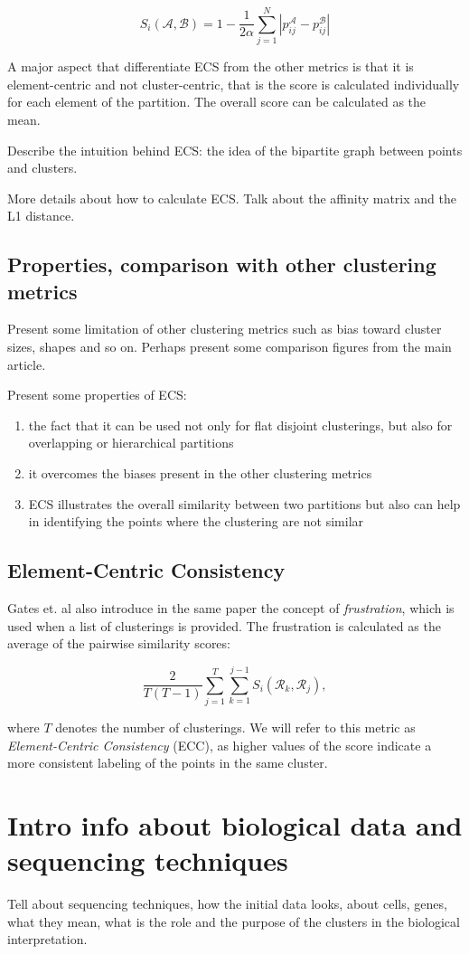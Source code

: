     \[ S_i (\mathcal{A}, \mathcal{B}) = 1 - \frac{1}{2 \alpha} \sum_{j = 1}^N |p_{ij}^{\mathcal{A}} - p_{ij}^{\mathcal{B}} | \]

    A major aspect that differentiate ECS from the other metrics is that it is element-centric and not cluster-centric, that is the score is calculated individually for each element of the partition. The overall score can be calculated as the mean.

    Describe the intuition behind ECS: the idea of the bipartite graph between points and clusters.

    More details about how to calculate ECS. Talk about the affinity matrix and the L1 distance.
    \subsection{Properties, comparison with other clustering metrics}
    Present some limitation of other clustering metrics such as bias toward cluster sizes, shapes and so on. Perhaps present some comparison figures from the main article.

    Present some properties of ECS:
    \begin{enumerate}
        \item the fact that it can be used not only for flat disjoint clusterings, but also for overlapping or hierarchical partitions
        \item it overcomes the biases present in the other clustering metrics
        \item ECS illustrates the overall similarity between two partitions but also can help in identifying the points where the clustering are not similar
    \end{enumerate}
    \subsection{Element-Centric Consistency}
    Gates et. al also introduce in the same paper the concept of \textit{frustration}, which is used when a list of clusterings is provided. The frustration is calculated as the average of the pairwise similarity scores:

    \[ \frac{2}{T(T-1)} \sum_{j=1}^T \sum_{k=1}^{j-1} S_i (\mathcal{R}_k, \mathcal{R}_j), \]

    where $T$ denotes the number of clusterings. We will refer to this metric as \textit{Element-Centric Consistency} (ECC), as higher values of the score indicate a more consistent labeling of the points in the same cluster.
    

\section{Intro info about biological data and sequencing techniques}
Tell about sequencing techniques, how the initial data looks, about cells, genes, what they mean, what is the role and the purpose of the clusters in the biological interpretation.

